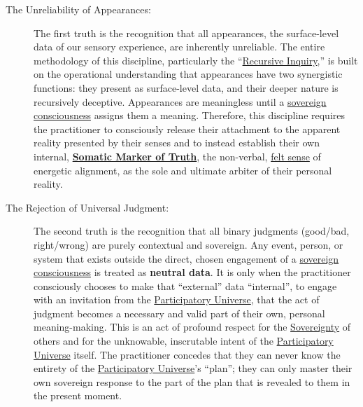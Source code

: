 \documentclass{article}
\begin{document}
\begin{description}
    \item[The Unreliability of Appearances:] The first truth is the recognition that all appearances, the surface-level data of our sensory experience, are inherently unreliable. The entire methodology of this discipline, particularly the ``\hyperlink{gloss:recursive_inquiry}{Recursive Inquiry},'' is built on the operational understanding that appearances have two synergistic functions: they present as surface-level data, and their deeper nature is recursively deceptive. Appearances are meaningless until a \hyperlink{gloss:sovereign_consciousness}{sovereign consciousness} assigns them a meaning. Therefore, this discipline requires the practitioner to consciously release their attachment to the apparent reality presented by their senses and to instead establish their own internal, \textbf{\hyperlink{gloss:somatic_marker_of_truth}{Somatic Marker of Truth}}, the non-verbal, \hyperlink{gloss:felt_sense}{felt sense} of energetic alignment, as the sole and ultimate arbiter of their personal reality.

    \item[The Rejection of Universal Judgment:] The second truth is the recognition that all binary judgments (good/bad, right/wrong) are purely contextual and sovereign. Any event, person, or system that exists outside the direct, chosen engagement of a \hyperlink{gloss:sovereign_consciousness}{sovereign consciousness} is treated as \textbf{neutral data}. It is only when the practitioner consciously chooses to make that ``external'' data ``internal'', to engage with an invitation from the \hyperlink{gloss:participatory_universe}{Participatory Universe}, that the act of judgment becomes a necessary and valid part of their own, personal meaning-making. This is an act of profound respect for the \hyperlink{gloss:sovereignty}{Sovereignty} of others and for the unknowable, inscrutable intent of the \hyperlink{gloss:participatory_universe}{Participatory Universe} itself. The practitioner concedes that they can never know the entirety of the \hyperlink{gloss:participatory_universe}{Participatory Universe}'s ``plan''; they can only master their own sovereign response to the part of the plan that is revealed to them in the present moment.
\end{description}
\end{document}
